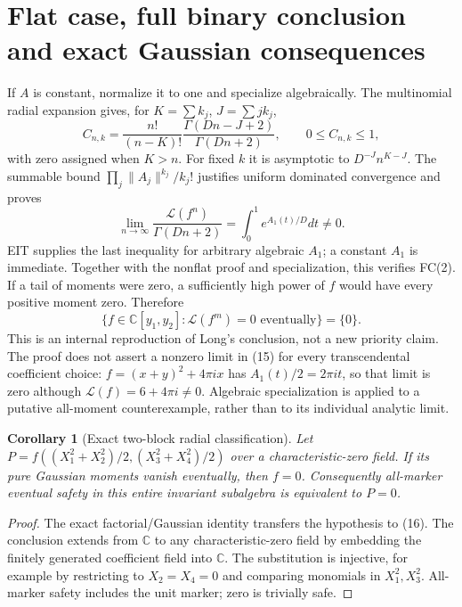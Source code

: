 \documentclass[11pt]{article}
\newtheorem{corollary}[theorem]{Corollary}
\newcommand{\C}{\mathbb C}
\newcommand{\Lfac}{\mathcal L}
\begin{document}
\section{Flat case, full binary conclusion and exact Gaussian consequences}
If $A$ is constant, normalize it to one and specialize algebraically.
The multinomial radial expansion gives, for $K=\sum k_j$, $J=\sum jk_j$,
\[
 C_{n,k}=\frac{n!}{(n-K)!}\frac{\Gamma(Dn-J+2)}{\Gamma(Dn+2)},
 \qquad 0\le C_{n,k}\le1,
\]
with zero assigned when $K>n$. For fixed $k$ it is asymptotic to
$D^{-J}n^{K-J}$. The summable bound $\prod_j\|A_j\|^{k_j}/k_j!$ justifies
uniform dominated convergence and proves
\[
 \lim_{n\to\infty}\frac{\Lfac(f^n)}{\Gamma(Dn+2)}
     =\int_0^1 e^{A_1(t)/D}dt\ne0.                          \tag{15}
\]
EIT supplies the last inequality for arbitrary algebraic $A_1$; a constant
$A_1$ is immediate. Together with the nonflat proof and specialization,
this verifies FC(2). If a tail of moments were zero, a sufficiently high
power of $f$ would have every positive moment zero. Therefore
\[
 \{f\in\C[y_1,y_2]:\Lfac(f^m)=0\text{ eventually}\}=\{0\}.  \tag{16}
\]
This is an internal reproduction of Long's conclusion, not a new priority claim.
The proof does not assert a nonzero limit in (15) for every transcendental
coefficient choice: $f=(x+y)^2+4\pi i x$ has $A_1(t)/2=2\pi i t$, so that
limit is zero although $\Lfac(f)=6+4\pi i\ne0$. Algebraic specialization
is applied to a putative all-moment counterexample, rather than to its
individual analytic limit.

\begin{corollary}[Exact two-block radial classification]
Let $P=f((X_1^2+X_2^2)/2,(X_3^2+X_4^2)/2)$ over a characteristic-zero
field. If its pure Gaussian moments vanish eventually, then $f=0$.
Consequently all-marker eventual safety in this entire invariant
subalgebra is equivalent to $P=0$.
\end{corollary}
\begin{proof}
The exact factorial/Gaussian identity transfers the hypothesis to (16).
The conclusion extends from $\C$ to any characteristic-zero field by
embedding the finitely generated coefficient field into $\C$.
The substitution is injective, for example by restricting to
$X_2=X_4=0$ and comparing monomials in $X_1^2,X_3^2$.
All-marker safety includes the unit marker; zero is trivially safe.
\end{proof}
\end{document}
